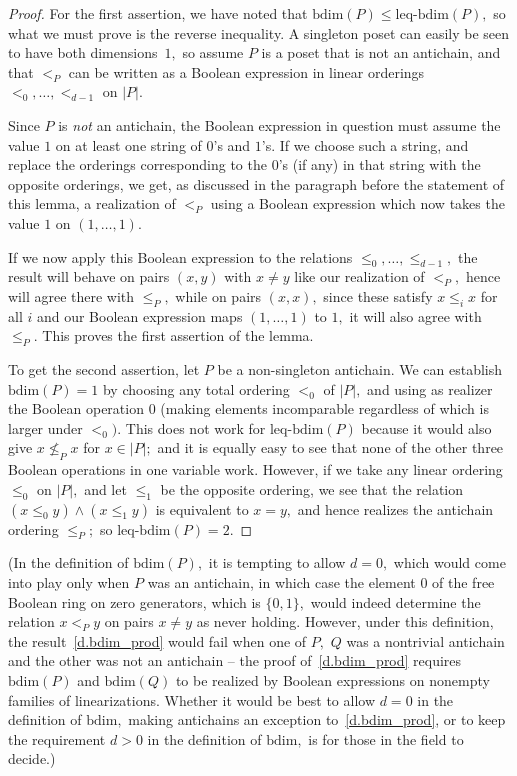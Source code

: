 \documentclass{amsart}
\numberwithin{equation}{section}
\numberwithin{theorem}{section}
\renewcommand{\r}{\mathrm}
\newcommand{\2}{\mathbf{2}}
\begin{document}
\begin{proof}
For the first assertion, we have noted that
$\r{bdim}(P)\leq\r{leq}\!$-$\!\r{bdim}(P),$ so what
we must prove is the reverse inequality.
A singleton poset can easily be seen to have both
dimensions~$1,$ so assume $P$ is a poset that is not an antichain,
and that $<_P$ can be written as a Boolean expression in
linear orderings $<_0,\dots,<_{d-1}$ on $|P|.$

Since $P$ is {\em not} an antichain, the Boolean expression in question
must assume the value $1$ on at least one string of $0$'s and $1$'s.
If we choose such a string, and
replace the orderings corresponding to the $0$'s (if any)
in that string with the opposite orderings, we get, as discussed in the
paragraph before the statement of this lemma, a realization of $<_P$
using a Boolean expression which now
takes the value $1$ on $(1,\dots,1).$

If we now apply this Boolean expression to the relations
$\leq_0,\dots,\leq_{d-1},$ the result will behave
on pairs $(x,y)$ with $x\neq y$ like our realization of $<_P,$
hence will agree there with $\leq_P,$ while on
pairs $(x,x),$ since these satisfy $x\leq_i x$ for all $i$
and our Boolean expression maps $(1,\dots,1)$ to $1,$
it will also agree with $\leq_P.$
This proves the first assertion of the lemma.

To get the second assertion, let $P$ be a non-singleton antichain.
We can establish $\r{bdim}(P)=1$ by choosing any total ordering $<_0$
of $|P|,$ and using as realizer the Boolean operation $0$
(making elements incomparable regardless of which is larger
under $<_0).$
This does not work for $\r{leq}\!$-$\!\r{bdim}(P)$ because it
would also give $x\nleq_P x$ for $x\in|P|;$ and it is equally
easy to see that none of the other three Boolean operations
in one variable work.
However, if we take any linear ordering $\leq_0$ on $|P|,$
and let $\leq_1$ be the opposite ordering,
we see that the relation $(x\leq_0 y)\wedge(x\leq_1 y)$
is equivalent to $x=y,$ and hence realizes the
antichain ordering $\leq_P;$ so $\r{leq}\!$-$\!\r{bdim}(P)=2.$
\end{proof}

(In the definition of $\r{bdim}(P),$ it is tempting to allow $d=0,$
which would come into play only when $P$ was an antichain,
in which case the element $0$ of the free Boolean ring
on zero generators, which is $\{0,1\},$ would indeed determine
the relation $x<_P y$ on pairs $x\neq y$ as never holding.
However, under this definition, the result~\eqref{d.bdim_prod} would
fail when one of $P,$ $Q$ was a nontrivial antichain and the other
was not an antichain -- the proof of~\eqref{d.bdim_prod} requires
$\r{bdim}(P)$ and $\r{bdim}(Q)$ to be realized by Boolean expressions
on nonempty families of linearizations.
Whether it would be best to allow $d=0$ in the definition
of $\r{bdim},$ making antichains an exception to~\eqref{d.bdim_prod},
or to keep the requirement $d>0$ in the definition
of $\r{bdim},$ is for those in the field to decide.)
\end{document}
